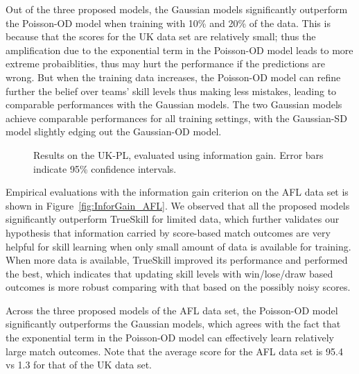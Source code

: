 Out of the three proposed models, the Gaussian models significantly outperform the Poisson-OD model when training with 10\% and 20\% of the data. This is because that the scores for the UK data set are relatively small; thus the amplification due to the exponential term in the Poisson-OD model leads to more extreme probaiblities, thus may hurt the performance if the predictions are wrong. But when the training data increases, the Poisson-OD model can refine further the belief over teams' skill levels thus making less mistakes, leading to comparable performances with the Gaussian models. The two Gaussian models achieve comparable performances for all training settings, with the Gaussian-SD model slightly edging out the Gaussian-OD model. 


\begin{center}
\begin{figure*}[htbp!]
 \centering
\caption{\small Results on the UK-PL, evaluated
using information gain. Error bars indicate
95\% confidence intervals.}
\label{fig:InforGain_UK}
\end{figure*}
\end{center}

Empirical evaluations with the information gain criterion on the AFL data set is shown in Figure~\ref{fig:InforGain_AFL}. We observed that all the proposed models significantly outperform TrueSkill for limited data, which further validates our hypothesis that information carried by score-based match outcomes are very helpful for skill learning when only small amount of data is available for training. When more data is available, TrueSkill improved its performance and performed the best, which indicates that updating skill levels with win/lose/draw based outcomes is more robust comparing with that based on the possibly noisy scores. 

Across the three proposed models of the AFL data set, the Poisson-OD model significantly outperforms the Gaussian models, which agrees with the fact that the exponential term in the Poisson-OD model can effectively learn relatively large match outcomes. Note that the average score for the AFL data set is 95.4 vs 1.3 for that of the UK data set. 

